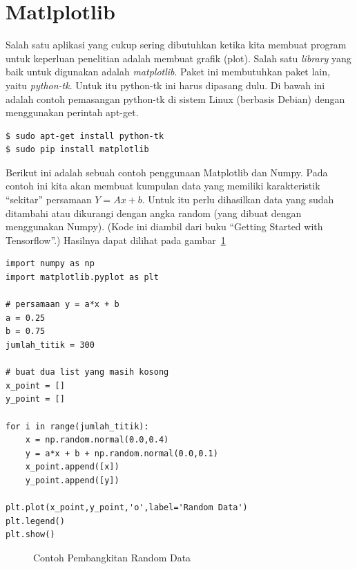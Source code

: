 \section{Matlplotlib}
Salah satu aplikasi yang cukup sering dibutuhkan ketika kita membuat program 
untuk keperluan penelitian adalah membuat grafik (plot). 
Salah satu {\em library} yang baik untuk digunakan adalah {\em matplotlib}. 
Paket ini membutuhkan paket lain, yaitu {\em python-tk}. 
Untuk itu python-tk ini harus dipasang dulu. 
Di bawah ini adalah contoh pemasangan python-tk di sistem Linux (berbasis Debian) 
dengan menggunakan perintah apt-get.

\begin{verbatim}
$ sudo apt-get install python-tk
$ sudo pip install matplotlib
\end{verbatim}

Berikut ini adalah sebuah contoh penggunaan Matplotlib dan Numpy. Pada contoh ini kita akan membuat kumpulan data yang memiliki karakteristik ``sekitar'' persamaan 
$Y = Ax + b$.
Untuk itu perlu dihasilkan data yang sudah ditambahi atau dikurangi dengan angka random (yang dibuat dengan menggunakan Numpy). (Kode ini diambil dari buku ``Getting Started with Tensorflow''\cite{tensorflowstarted}.)
Hasilnya dapat dilihat pada gambar~\ref{fig:randomnumpy}


\begin{verbatim}
import numpy as np
import matplotlib.pyplot as plt

# persamaan y = a*x + b
a = 0.25
b = 0.75
jumlah_titik = 300

# buat dua list yang masih kosong
x_point = []
y_point = []

for i in range(jumlah_titik):
    x = np.random.normal(0.0,0.4)
    y = a*x + b + np.random.normal(0.0,0.1)
    x_point.append([x])
    y_point.append([y])

plt.plot(x_point,y_point,'o',label='Random Data')
plt.legend()
plt.show()
\end{verbatim}


\begin{figure}[ht]
\caption{Contoh Pembangkitan Random Data}
\label{fig:randomnumpy}
\end{figure}

